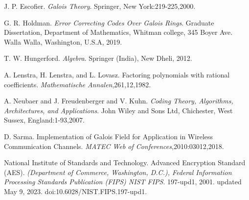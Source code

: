 
\begin{thebibliography}{9}

J. P. Escofier. \emph{Galois Theory}. Springer, New York:219-225,2000.

G. R. Holdman. \emph{Error Correcting Codes  Over Galois Rings}. Graduate Dissertation, Department of Mathematics, Whitman college, 345 Boyer Ave.
Walla Walla, Washington, U.S.A, 2019.

T. W. Hungerford. \emph{Algebra}. Springer (India), New Dheli, 2012.

A. Lenstra, H. Lenstra, and L. Lovasz. Factoring polynomials with rational coefficients. \emph{Mathematische Annalen},261,12,1982.

A. Neubaer and J. Freudenberger and V. Kuhn. \emph{Coding Theory, Algorithms, Architectures, and Applications}. John Wiley and Sons Ltd, Chichester, West Sussex, England:1-93,2007.

D. Sarma. Implementation of Galois Field for Application in Wireless Communication Channels. \emph{MATEC Web of Conferences},2010:03012,2018.

National Institute of Standards and Technology. Advanced Encryption
Standard (AES). \emph{(Department of Commerce, Washington, D.C.), Federal Information Processing Standards Publication (FIPS) NIST FIPS}. 197-upd1, 2001. updated May 9, 2023. doi:10.6028/NIST.FIPS.197-upd1.
\end{thebibliography}
\clearpage